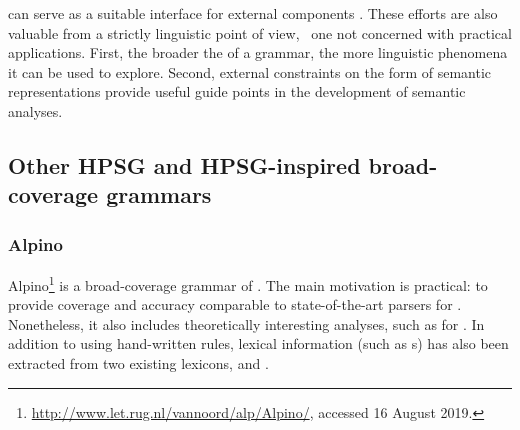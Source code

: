 \documentclass[output=paper
	        ,collection
	        ,collectionchapter
 	        ,biblatex
                ,babelshorthands
                ,newtxmath
                ,draftmode
                ,colorlinks, citecolor=brown
]{langscibook}
\begin{document}
can serve as a suitable interface for external
components \citep[e.g.,][]{flickinger2005sem}. 
These efforts are also valuable from a strictly linguistic point of view, \ie\ one not concerned with practical applications.
First, the broader the  of a grammar,
the more linguistic phenomena it can be used to explore.
Second, external constraints on the form of semantic representations provide
useful guide points in the development of semantic analyses.%
%


\subsection{Other HPSG and HPSG-inspired broad-coverage grammars}
\label{cl:othergrammars}

\subsubsection{Alpino}
\label{cl:other:alpino}


Alpino\footnote{%
	\url{http://www.let.rug.nl/vannoord/alp/Alpino/}, accessed 16 August 2019.
}
is a broad-coverage grammar of 
\citep{BvNM2001a-u,vannoord2005alpino,vannoord2006alpino}.
The main motivation is practical: to provide coverage and accuracy
comparable to state-of-the-art parsers for .
Nonetheless, it also includes theoretically interesting analyses,
such as for  \citep{BvN98a}.
In addition to using hand-written rules,
lexical information (such as s) has also been extracted from two existing lexicons,
 \citep{baayen1995celex}
and  \citep{kruyt1997parole}.
\end{document}
